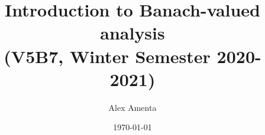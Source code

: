 \title[Intro to Banach-valued analysis]{Introduction to Banach-valued analysis \\ (V5B7, Winter Semester 2020-2021)}
\date{\today}

\author[A. Amenta]{Alex Amenta}
\address{\noindent Mathematisches Institut \newline \indent Universit\"at Bonn, Bonn, Germany}


